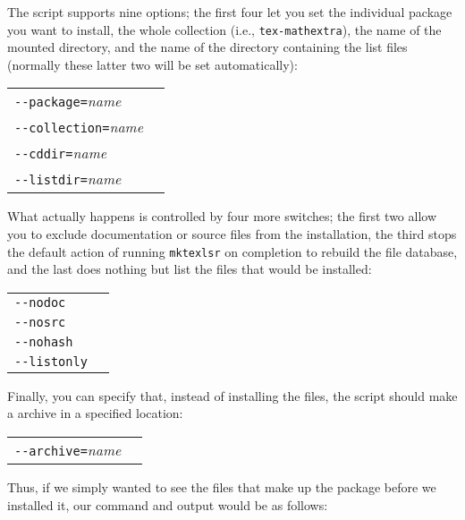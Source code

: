\documentclass{article}
\begin{document}
The script supports nine options; the first four let you set the
individual package you want to install, the whole collection (i.e.,
\texttt{tex-mathextra}), the name of the mounted \CD{} directory, and
the name of the directory containing the list files (normally these
latter two will be set automatically):

\begin{tabular}{ll}
\texttt{-{}-package=}\emph{name} & \\
\texttt{-{}-collection=}\emph{name} & \\
\texttt{-{}-cddir=}\emph{name} & \\
\texttt{-{}-listdir=}\emph{name} & \\
\end{tabular}

What actually happens is controlled by four more switches; the first
two allow you to exclude documentation or source files from the
installation, the third stops the default action of running
\texttt{mktexlsr} on completion to rebuild the file database, and
the last does nothing but list the files that would be installed:

\begin{tabular}{ll}
\texttt{-{}-nodoc} & \\
\texttt{-{}-nosrc} & \\
\texttt{-{}-nohash} & \\
\texttt{-{}-listonly} & \\
\end{tabular}

Finally, you can specify that, instead of installing the files, the script
should make a  archive in a specified location:

\begin{tabular}{ll}
\texttt{-{}-archive=}\emph{name} & \\
\end{tabular}

Thus, if we simply wanted to see the files that make up the package
 before we installed it, our command and output would be
as follows:
\end{document}
